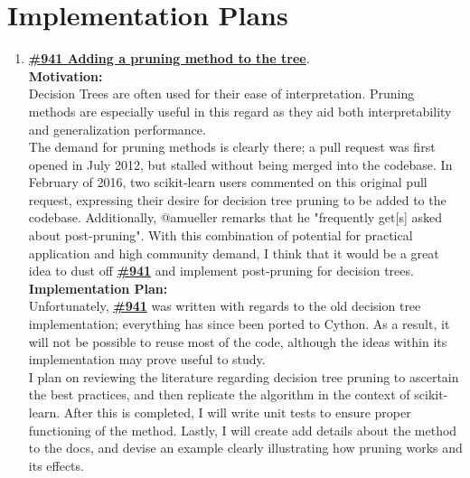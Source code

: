 \documentclass[12pt, oneside]{article}
\begin{document}
\section{Implementation Plans}
\begin{enumerate}
  \item
  \textbf{\href{https://github.com/scikit-learn/scikit-learn/pull/941}
    {\#941 Adding a pruning method to the tree}}.\\
  \textbf{Motivation:}\\
  Decision Trees are often used for their ease of
  interpretation. Pruning methods are especially useful in this regard
  as they aid both interpretability and generalization performance.\\
  The demand for pruning methods is clearly there; a pull request was
  first opened in July 2012, but stalled without being merged into the
  codebase. In February of 2016, two scikit-learn users commented on
  this original pull request, expressing their desire for decision
  tree pruning to be added to the codebase. Additionally, @amueller
  remarks that he "frequently get[s] asked about post-pruning". With
  this combination of potential for practical application and high
  community demand, I think that it would be a great idea to dust off
  \textbf{\href{https://github.com/scikit-learn/scikit-learn/pull/941}
    {\#941}} and implement post-pruning for decision trees.\\
  \textbf{Implementation Plan:}\\
  Unfortunately,
  \textbf{\href{https://github.com/scikit-learn/scikit-learn/pull/941}
    {\#941}} was written with regards to the old decision tree
  implementation; everything has since been ported to Cython. As a
  result, it will not be possible to reuse most of the code, although
  the ideas within its implementation may prove useful to study.\\
  I plan on reviewing the literature regarding decision tree pruning
  to ascertain the best practices, and then replicate the algorithm in
  the context of scikit-learn. After this is completed, I will write
  unit tests to ensure proper functioning of the method. Lastly, I
  will create add details about the method to the docs, and devise an
  example clearly illustrating how pruning works and its effects.
  

\end{enumerate}
\end{document}
